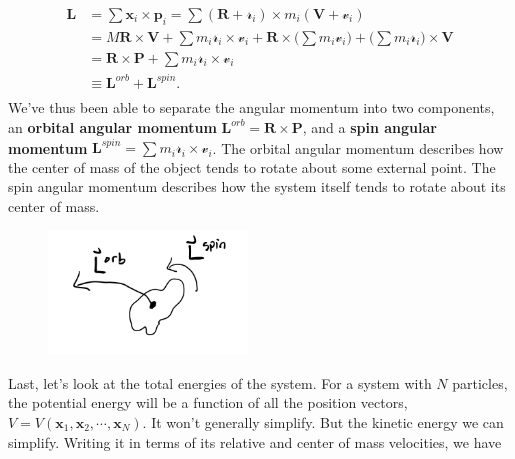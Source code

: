 \documentclass[
  letterpaper,
  DIV=11,
  numbers=noendperiod]{scrreprt}
\begin{document}
\[
\begin{align*} 
\mathbf{L} &= \sum \mathbf{x}_i \times \mathbf{p}_i = \sum (\mathbf{R} + \boldsymbol{\mathscr{r}}_i) \times m_i(\mathbf{V} + \boldsymbol{\mathscr{v}}_i) \\
&= M\mathbf{R} \times \mathbf{V} + \sum m_i \boldsymbol{\mathscr{r}}_i \times \boldsymbol{\mathscr{v}}_i + \mathbf{R} \times \bigg(\sum m_i \boldsymbol{\mathscr{v}}_i \bigg) + \bigg(\sum m_i \boldsymbol{\mathscr{r}}_i \bigg)\times \mathbf{V} \\
&= \mathbf{R} \times \mathbf{P} + \sum m_i \boldsymbol{\mathscr{r}}_i \times \boldsymbol{\mathscr{v}}_i \\
&\equiv \mathbf{L}^{orb} + \mathbf{L}^{spin}. \\
\end{align*}
\] We've thus been able to separate the angular momentum into two
components, an \textbf{orbital angular momentum}
\(\mathbf{L}^{orb} = \mathbf{R} \times \mathbf{P}\), and a \textbf{spin
angular momentum}
\(\mathbf{L}^{spin} = \sum m_i \boldsymbol{\mathscr{r}}_i \times \boldsymbol{\mathscr{v}}_i\).
The orbital angular momentum describes how the center of mass of the
object tends to rotate about some external point. The spin angular
momentum describes how the system itself tends to rotate about its
center of mass.

\begin{figure}

{\centering \includegraphics[width=2.08333in,height=\textheight]{classical-mechanics/./resources/image-20230212040206890.png}

}

\end{figure}

Last, let's look at the total energies of the system. For a system with
\(N\) particles, the potential energy will be a function of all the
position vectors,
\(V = V(\mathbf{x}_1, \mathbf{x}_2, \cdots, \mathbf{x}_N)\). It won't
generally simplify. But the kinetic energy we can simplify. Writing it
in terms of its relative and center of mass velocities, we have
\end{document}
